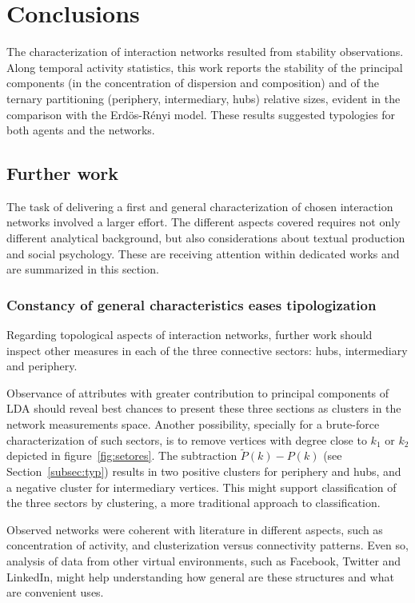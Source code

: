 \documentclass[%
 aip,
 jmp,%
 amsmath,amssymb,
 reprint,%
]{revtex4-1}
\begin{document}
\section{Conclusions}
The characterization of interaction networks resulted from stability observations. Along temporal activity statistics, this work reports the stability of the principal components (in the concentration of dispersion and composition) and of the ternary partitioning (periphery, intermediary, hubs) relative sizes, evident in the comparison with the Erd\"os-R\'enyi model. These results suggested typologies for both agents and the networks.


    \subsection{Further work}
The task of delivering a first and general characterization of chosen interaction networks involved a larger effort. The different aspects covered requires not only different analytical background, but also considerations about textual production and social psychology. These are receiving attention within dedicated works and are summarized in this section.

        \subsubsection{Constancy of general characteristics eases tipologization}

Regarding topological aspects of interaction networks, further work should inspect other measures in each of the three connective sectors: hubs, intermediary and periphery.

Observance of attributes with greater contribution to principal components of LDA should reveal best chances to present these three sections as clusters in the network measurements space. Another possibility, specially for a brute-force characterization of such sectors, is to remove vertices with degree close to $k_1$ or $k_2$ depicted in figure~\ref{fig:setores}. The subtraction $\widetilde{P}(k)-P(k)$ (see Section~\ref{subsec:typ}) results in two positive clusters for periphery and hubs, and a negative cluster for intermediary vertices. This might support classification of the three sectors by clustering, a more traditional approach to classification.

Observed networks were coherent with literature in different aspects, such as concentration of activity, and clusterization versus connectivity patterns. Even so, analysis of data from other virtual environments, such as Facebook, Twitter and LinkedIn, might help understanding how general are these structures and what are convenient uses.
\end{document}
